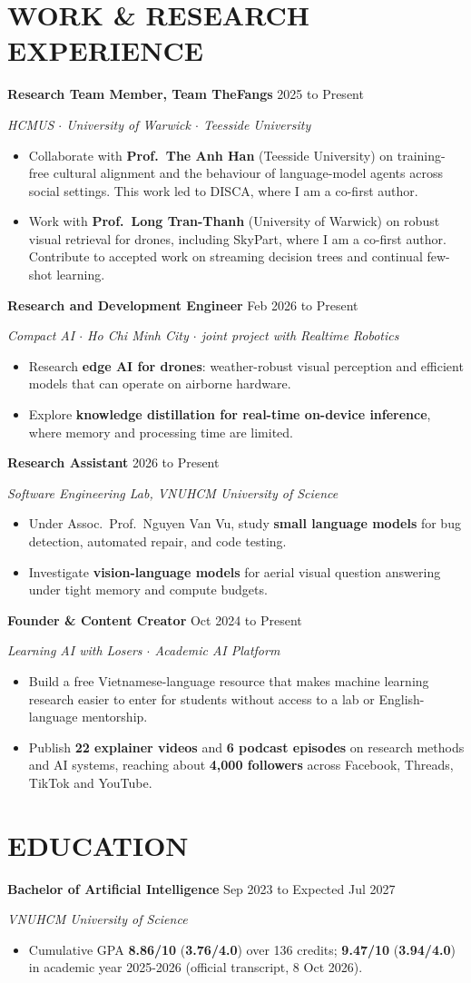 \documentclass[10pt,a4paper]{article}
\newcommand{\entry}[4]{
    {\noindent\textbf{#1} \hfill #2\par}
    {\textit{#3}\par}
    \begin{itemize}[label={},labelwidth=0pt,labelsep=0pt]
        #4
    \end{itemize}
}
\begin{document}
\section*{WORK \& RESEARCH EXPERIENCE}
\entry{Research Team Member, Team TheFangs}{2025 to Present}{HCMUS $\cdot$ University of Warwick $\cdot$ Teesside University}{
    \item Collaborate with \textbf{Prof.\ The Anh Han} (Teesside University) on training-free cultural alignment and the behaviour of language-model agents across social settings. This work led to DISCA, where I am a co-first author.
    \item Work with \textbf{Prof.\ Long Tran-Thanh} (University of Warwick) on robust visual retrieval for drones, including SkyPart, where I am a co-first author. Contribute to accepted work on streaming decision trees and continual few-shot learning.
}
\entry{Research and Development Engineer}{Feb 2026 to Present}{Compact AI $\cdot$ Ho Chi Minh City $\cdot$ joint project with Realtime Robotics}{
    \item Research \textbf{edge AI for drones}: weather-robust visual perception and efficient models that can operate on airborne hardware.
    \item Explore \textbf{knowledge distillation for real-time on-device inference}, where memory and processing time are limited.
}
\entry{Research Assistant}{2026 to Present}{Software Engineering Lab, VNUHCM University of Science}{
    \item Under Assoc.\ Prof.\ Nguyen Van Vu, study \textbf{small language models} for bug detection, automated repair, and code testing.
    \item Investigate \textbf{vision-language models} for aerial visual question answering under tight memory and compute budgets.
}
\entry{Founder \& Content Creator}{Oct 2024 to Present}{Learning AI with Losers $\cdot$ Academic AI Platform}{
    \item Build a free Vietnamese-language resource that makes machine learning research easier to enter for students without access to a lab or English-language mentorship.
    \item Publish \textbf{22 explainer videos} and \textbf{6 podcast episodes} on research methods and AI systems, reaching about \textbf{4,000 followers} across Facebook, Threads, TikTok and YouTube.
}

\section*{EDUCATION}
\entry{Bachelor of Artificial Intelligence}{Sep 2023 to Expected Jul 2027}{VNUHCM University of Science}{
    \item Cumulative GPA \textbf{8.86/10} (\textbf{3.76/4.0}) over 136 credits; \textbf{9.47/10} (\textbf{3.94/4.0}) in academic year 2025-2026 (official transcript, 8 Oct 2026).
}
\end{document}
